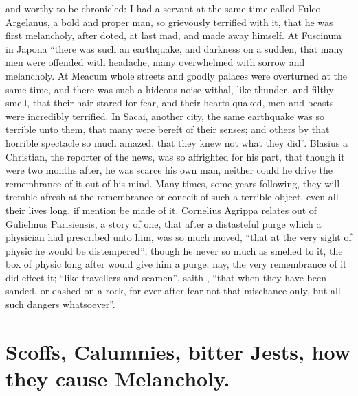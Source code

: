 and worthy to be chronicled: I had a servant at the same time called Fulco
Argelanus, a bold and proper man, so grievously terrified with it, that he
was first melancholy, after doted, at last mad, and made
away himself. At Fuscinum in Japona \enquote{there was such an
earthquake, and darkness on a sudden, that many men were offended with
headache, many overwhelmed with sorrow and melancholy. At Meacum whole streets
and goodly palaces were overturned at the same time, and there was such a
hideous noise withal, like thunder, and filthy smell, that their hair stared
for fear, and their hearts quaked, men and beasts were incredibly terrified. In
Sacai, another city, the same earthquake was so terrible unto them, that many
were bereft of their senses; and others by that horrible spectacle so much
amazed, that they knew not what they did}. Blasius a Christian, the reporter of
the news, was so affrighted for his part, that though it were two months after,
he was scarce his own man, neither could he drive the remembrance of it out of
his mind. Many times, some years following, they will tremble afresh at the
remembrance or conceit of such a terrible object, even all
their lives long, if mention be made of it. Cornelius Agrippa relates out of
Gulielmus Parisiensis, a story of one, that after a distasteful purge which a
physician had prescribed unto him, was so much moved,
\enquote{that at the very sight of physic he would be
distempered}, though he never so much as smelled to it, the box of physic long
after would give him a purge; nay, the very remembrance of it did effect it;
\enquote{like travellers and seamen}, saith \Plutarch{}, \enquote{that when
they have been sanded, or dashed on a rock, for ever after fear not that
mischance only, but all such dangers whatsoever}.

\section[Scoffs, bitter Jests]{Scoffs, Calumnies, bitter Jests, how they cause Melancholy.}\label{sec:scoffs-bitter-jests}

